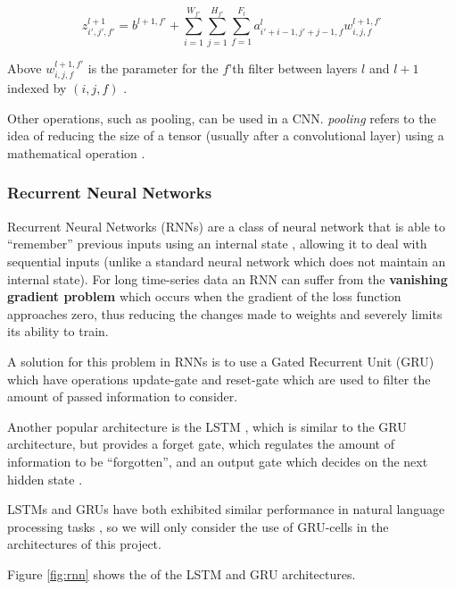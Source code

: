  \[z_{i',j',f'}^{l+1} = b^{l+1,f'} + \sum_{i=1}^{W_{f'}}\sum_{j=1}^{H_{f'}}\sum_{f=1}^{F_l}a^l_{i'+i-1,j'+j-1,f} w^{l+1,f'}_{i,j,f}
 \]
 
 Above $w^{l+1,f'}_{i,j,f}$ is the parameter for the $f$'th filter between layers $l$ and $l+1$ indexed by $(i,j,f)$ \cite{csmlnotes}.
 
 
 
Other operations, such as pooling, can be used in a CNN. \textit{pooling} refers to the idea of reducing the size of a tensor (usually after a convolutional layer) using a mathematical operation \cite{cnn}.

\subsubsection{Recurrent Neural Networks}
Recurrent Neural Networks (RNNs) are a class of neural network that is able to ``remember'' previous inputs using an internal state \cite{rnn}, allowing it to deal with sequential inputs (unlike a standard neural network which does not maintain an internal state). For long time-series data an RNN can suffer from the \textbf{vanishing gradient problem} \cite{rnn} which occurs when the gradient of the loss function approaches zero, thus reducing the changes made to weights and severely limits its ability to train. 

A solution for this problem in RNNs is to use a Gated Recurrent Unit (GRU) \cite{gru} which have operations update-gate and reset-gate which are used to filter the amount of passed information to consider. 

Another popular architecture is the LSTM \cite{lstm}, which is similar to the GRU architecture, but provides a forget gate, which regulates the amount of information to be ``forgotten'', and an output gate which decides on the next hidden state \cite{lstm}.

LSTMs and GRUs have both exhibited similar performance in natural language processing tasks \cite{lstmvsgru}, so we will only consider the use of GRU-cells in the architectures of this project.

Figure \ref{fig:rnn} shows the of the LSTM and GRU architectures.

